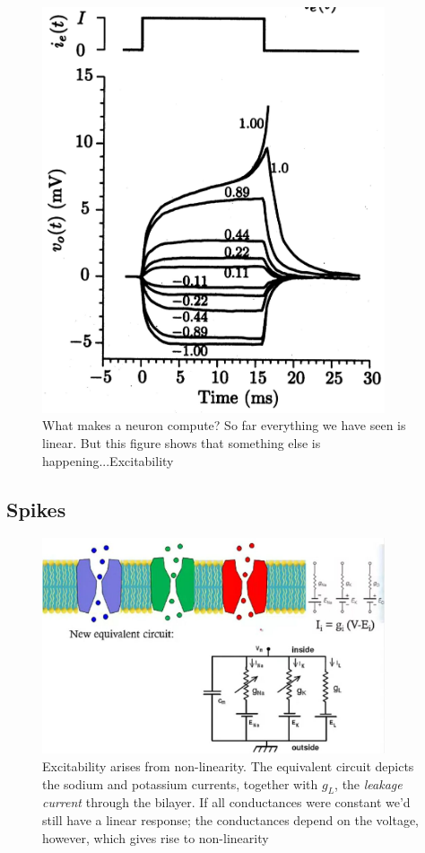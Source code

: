 \documentclass[]{article}
\begin{document}
\begin{figure}[H]
	\caption[What makes a neuron compute?]{What makes a neuron compute? So far everything we have seen is linear. But this figure shows that something else is happening...Excitability}
	\includegraphics[width=0.9\textwidth]{what-makes-neuron-compute}
\end{figure}


\subsection{Spikes}

\begin{figure}[H]
	\caption[Excitability arises from non-linearity]{Excitability arises from non-linearity. The equivalent circuit depicts the sodium and potassium currents, together with $g_L$, the \emph{leakage current} through the bilayer. If all conductances were constant we'd still have a linear response; the conductances depend on the voltage, however, which gives rise to non-linearity}
	\includegraphics[width=0.9\textwidth]{excitability-arises-from-non-linearity}
\end{figure}
\end{document}
